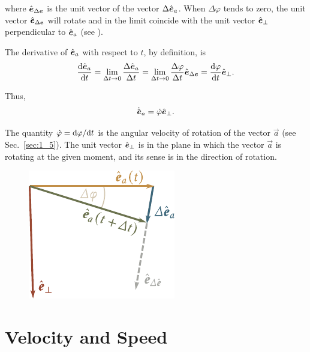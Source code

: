 \noindent
where $\hat{\boldsymbol{e}}_{\Delta\boldsymbol{e}}$ is the unit vector of the vector $\Delta\hat{\boldsymbol{e}}_{a}$. When $\Delta\varphi$ tends to zero, the unit vector $\hat{\boldsymbol{e}}_{\Delta\boldsymbol{e}}$ will rotate and in the limit coincide with the unit vector $\hat{\boldsymbol{e}}_{\perp}$ perpendicular to $\hat{\boldsymbol{e}}_{a}$ (see ).

The derivative of $\hat{\boldsymbol{e}}_{a}$ with respect to $t$, by definition, is
\begin{equation*}
\frac{\mathrm{d}\hat{\boldsymbol{e}}_{a}}{\mathrm{d} t} = \lim_{\Delta t\to 0} \frac{\Delta\hat{\boldsymbol{e}}_{a}}{\Delta t} = \lim_{\Delta t\to 0} \frac{\Delta\varphi}{\Delta t}\hat{\boldsymbol{e}}_{\Delta\boldsymbol{e}} = \frac{\mathrm{d}\varphi}{\mathrm{d} t}\hat{\boldsymbol{e}}_{\perp}.
\end{equation*}

\noindent
Thus,
\begin{equation}\label{eq:1_56}
\dot{\hat{\boldsymbol{e}}}_{a} = \dot{\varphi}\hat{\boldsymbol{e}}_{\perp}.
\end{equation}

\noindent
The quantity $\dot{\varphi}=\mathrm{d}\varphi/\mathrm{d} t$ is the angular velocity of rotation of the vector $\vec{a}$ (see Sec.~\ref{sec:1_5}). The unit vector $\hat{\boldsymbol{e}}_{\perp}$ is in the plane in which the vector $\vec{a}$ is rotating at the given moment, and its sense is in the direction of rotation.

\begin{figure}[t]
	\begin{center}
		\includegraphics[scale=0.95]{figures/ch_01/fig_1_19.pdf}
		\caption[]{}
		\label{fig:1_19}
	\end{center}
	\vspace{-0.7cm}
\end{figure}

\section{Velocity and Speed}\label{sec:1_3}

